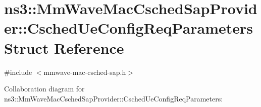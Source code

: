 \hypertarget{structns3_1_1MmWaveMacCschedSapProvider_1_1CschedUeConfigReqParameters}{}\section{ns3\+:\+:Mm\+Wave\+Mac\+Csched\+Sap\+Provider\+:\+:Csched\+Ue\+Config\+Req\+Parameters Struct Reference}
\label{structns3_1_1MmWaveMacCschedSapProvider_1_1CschedUeConfigReqParameters}


{\ttfamily \#include $<$mmwave-\/mac-\/csched-\/sap.\+h$>$}



Collaboration diagram for ns3\+:\+:Mm\+Wave\+Mac\+Csched\+Sap\+Provider\+:\+:Csched\+Ue\+Config\+Req\+Parameters\+:
